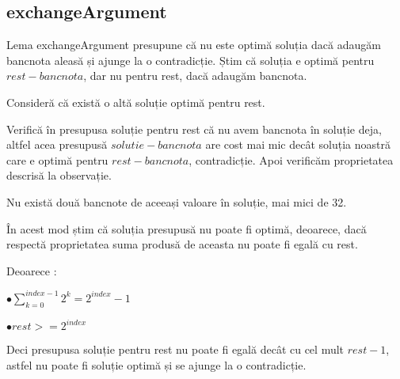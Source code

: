     \subsection{exchangeArgument}
    Lema exchangeArgument presupune că nu este optimă soluția dacă adaugăm bancnota aleasă și ajunge la o contradicție.
    Știm că soluția e optimă pentru $rest - bancnota$, dar nu pentru rest, dacă adaugăm bancnota.\par
    Consideră că există o altă soluție optimă pentru rest.\par
    Verifică în presupusa soluție pentru rest că nu avem bancnota în soluție deja, altfel acea presupusă 
    $solutie - bancnota$ are cost mai mic decât soluția noastră care e optimă pentru $rest - bancnota$, contradicție.
    Apoi verificăm proprietatea descrisă la observație.\par
    Nu există două bancnote de aceeași valoare în soluție, mai mici de 32.\par
    În acest mod știm că soluția presupusă nu poate fi optimă, deoarece, dacă respectă proprietatea
    suma produsă de aceasta nu poate fi egală cu rest. \par
    Deoarece :\par
    $\bullet \sum_{k=0}^{index-1} 2^{k} = 2^{index}-1 $\par
    $\bullet rest > = 2^{index} $ \par
    Deci presupusa soluție pentru rest nu poate fi egală decât cu cel mult $rest-1$, astfel nu poate fi soluție optimă și se ajunge la o contradicție. 

